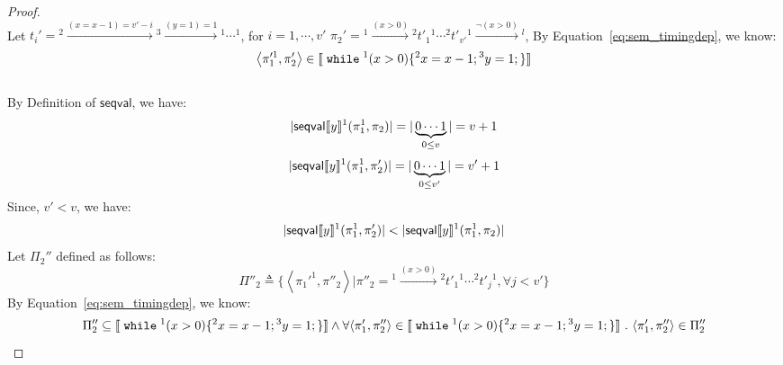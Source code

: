 \begin{example}
\begin{proof}
\[\]
%
Let 
$t_i' = {}^2 \xrightarrow{(x = x - 1) = v' - i } {}^3 \xrightarrow{(y = 1) = 1} {}^1 \cdots  {}^1$, for $i = 1, \cdots, v'$
%
$\pi_2' = {}^1 \xrightarrow{(x > 0)} {}^2 t'_1 {}^1 \cdots  {}^2 t'_{v'} {}^1 \xrightarrow{\neg(x > 0)} {}^l $,
%
 By Equation~\ref{eq:sem_timingdep}, we know:
\[
	\left< \pi_1'^1, \pi'_2 \right> \in \sem{\ewhile {}^1 (x > 0) \{{}^2 x = x - 1; {}^3 y = 1;\} }
\]
%
\\
By Definition of $\mathsf{seqval}$, we have:
\[
	|\mathsf{seqval}\llbracket y \rrbracket{}^1(\pi_1^1, \pi_2 )| = |\underbrace{0 \cdots 1}_{0 \leq v}| = v + 1
\]
%
\[
	|\mathsf{seqval}\llbracket y \rrbracket{}^1(\pi_1^1, \pi_2' )| = |\underbrace{0 \cdots 1}_{0 \leq v'}| = v' + 1
\]
%
Since, $v' < v $, we have: 
\[
	|\mathsf{seqval}\llbracket y \rrbracket{}^1(\pi_1^1, \pi_2' )| < |\mathsf{seqval}\llbracket y \rrbracket{}^1(\pi_1^1, \pi_2 )|
\]
%
Let $\Pi_2''$ defined as follows:
\[
	\Pi''_2 \triangleq \{
	\left< \pi_1'^1, \pi''_2 \right> \vert
	\pi''_2 =  {}^1 \xrightarrow{(x > 0)} {}^2 t'_1 {}^1 \cdots  {}^2 t'_{j} {}^1, \forall j < v'\} 
\]
%
By Equation~\ref{eq:sem_timingdep}, we know:
%
\[
		\Pi''_2 \subseteq \sem{\ewhile {}^1 (x > 0) \{{}^2 x = x - 1; {}^3 y = 1;\} }
		\land
		\forall \left< \pi_1', \pi''_2 \right> \in \sem{\ewhile {}^1 (x > 0) \{{}^2 x = x - 1; {}^3 y = 1;\} } 
		\st \left< \pi_1', \pi''_2 \right> \in  \Pi''_2
\]
%


\end{proof}
\end{example}

